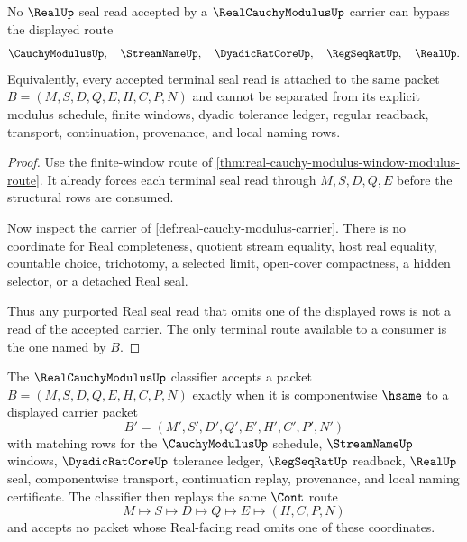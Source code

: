 \begin{theorem}
\label{thm:real-cauchy-modulus-real-seal-nonescape}
No $\RealUp$ seal read accepted by a $\RealCauchyModulusUp$ carrier can bypass the displayed route
$$
\CauchyModulusUp,\quad \StreamNameUp,\quad \DyadicRatCoreUp,\quad \RegSeqRatUp,\quad \RealUp .
$$
Equivalently, every accepted terminal seal read is attached to the same packet $B=(M,S,D,Q,E,H,C,P,N)$ and cannot be separated from its explicit modulus schedule, finite windows, dyadic tolerance ledger, regular readback, transport, continuation, provenance, and local naming rows.
\end{theorem}
\begin{proof}
Use the finite-window route of \autoref{thm:real-cauchy-modulus-window-modulus-route}. It already forces each terminal seal read through $M,S,D,Q,E$ before the structural rows are consumed.

Now inspect the carrier of \autoref{def:real-cauchy-modulus-carrier}. There is no coordinate for Real completeness, quotient stream equality, host real equality, countable choice, trichotomy, a selected limit, open-cover compactness, a hidden selector, or a detached Real seal.

Thus any purported Real seal read that omits one of the displayed rows is not a read of the accepted carrier. The only terminal route available to a consumer is the one named by $B$.
\end{proof}

\begin{definition}
\label{def:real-cauchy-modulus-classifier}
The $\RealCauchyModulusUp$ classifier accepts a packet $B=(M,S,D,Q,E,H,C,P,N)$ exactly when it is componentwise $\hsame$ to a displayed carrier packet
$$
B'=(M',S',D',Q',E',H',C',P',N')
$$
with matching rows for the $\CauchyModulusUp$ schedule, $\StreamNameUp$ windows, $\DyadicRatCoreUp$ tolerance ledger, $\RegSeqRatUp$ readback, $\RealUp$ seal, componentwise transport, continuation replay, provenance, and local naming certificate. The classifier then replays the same $\Cont$ route
$$
M\longmapsto S\longmapsto D\longmapsto Q\longmapsto E\longmapsto(H,C,P,N)
$$
and accepts no packet whose Real-facing read omits one of these coordinates.
\end{definition}

